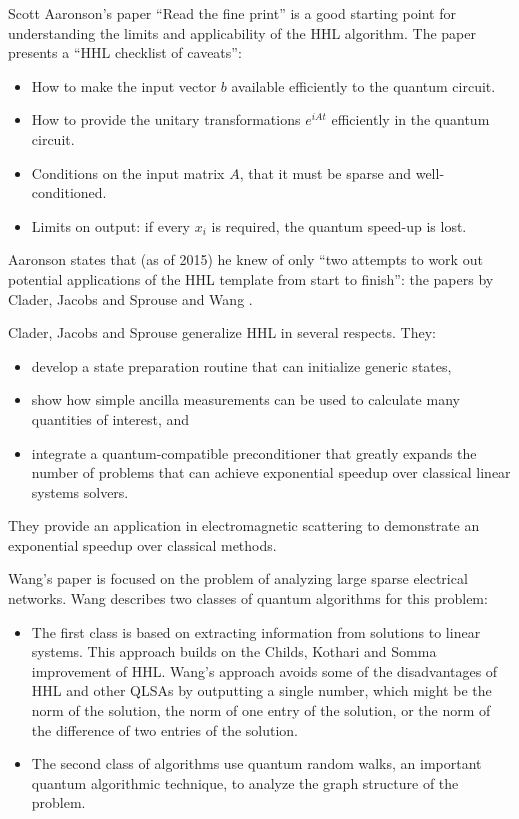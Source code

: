 \documentclass[12pt]{extarticle}
\begin{document}
Scott Aaronson's paper ``Read the fine print'' \cite{aaronson2015read} is a good starting point for understanding the limits and applicability of the HHL algorithm.
The paper presents a ``HHL checklist of caveats'':

\begin{itemize}
\item How to make the input vector $b$ available efficiently to the quantum circuit.
\item How to provide the unitary transformations $e^{iAt}$ efficiently in the quantum circuit.
\item Conditions on the input matrix $A$, that it must be sparse and well-conditioned.
\item Limits on output: if every $x_i$ is required, the quantum speed-up is lost.
\end{itemize}

Aaronson states that (as of 2015) he knew of only ``two attempts to work out potential applications of the HHL template from start to finish'':
the papers by Clader, Jacobs and Sprouse \cite{clader2013preconditioned} and Wang \cite{wang2017efficient}.

Clader, Jacobs and Sprouse generalize HHL in several respects. They:
\begin{itemize}
\item develop a state preparation routine that can initialize generic states,
\item show how simple ancilla measurements can be used to calculate many quantities of interest, and
\item integrate a quantum-compatible preconditioner that greatly expands the number of problems that can achieve exponential speedup over classical linear systems solvers.
\end{itemize}
They provide an application in electromagnetic scattering to demonstrate an exponential speedup over classical methods.

Wang's paper is focused on the problem of analyzing large sparse electrical networks.
Wang describes two classes of quantum algorithms for this problem:
\begin{itemize}
\item The first class is based on extracting information from solutions to linear systems.
This approach builds on the Childs, Kothari and Somma\cite{somma2016quantum} improvement of HHL.
Wang's approach avoids some of the disadvantages of HHL and other QLSAs by outputting a single number,
which might be the norm of the solution, the norm of one entry of the solution, or the norm of the difference of two entries of the solution.
\item The second class of algorithms use quantum random walks, an important quantum algorithmic technique,
to analyze the graph structure of the problem.
\end{itemize}
\end{document}
